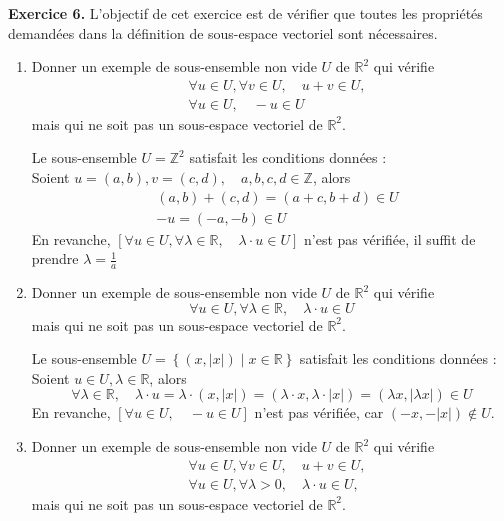 \documentclass[a4paper, 10pt]{report}
\providecommand{\abs}[1]{\lvert#1\rvert}
\begin{document}
	
	\newpage
	
	\noindent
	\textbf{Exercice 6.} L’objectif de cet exercice est de
	vérifier que toutes les propriétés demandées dans la définition
	de sous-espace vectoriel sont nécessaires.
	
	\begin{enumerate}[label=\arabic*.]
		\item Donner un exemple de sous-ensemble non vide $U$ de
		$\mathbb{R}^2$ qui vérifie
		\[\begin{split}
			&\forall u \in U, \forall v \in U, \quad u + v \in U,\\
			&\forall u \in U, \quad -u \in U
		\end{split}\]
		mais qui ne soit pas un sous-espace vectoriel de $\mathbb{R}^2$.
		
		\colorbox{solution}
		{
			\begin{minipage}{0.9\textwidth}
				Le sous-ensemble $U = \mathbb{Z}^2$ satisfait les
				conditions données :\\
				Soient $u = (a, b), v = (c, d),
					\quad a, b, c, d \in \mathbb{Z}$, alors
				\[\begin{split}
					&(a, b) + (c, d) = (a+c, b+d) \in U\\
					&-u = (-a, -b) \in U
				\end{split}\]
				En revanche, $[\forall u \in U,
					\forall \lambda \in \mathbb{R}, \quad
					\lambda \cdot u \in U]$ n'est pas vérifiée,
				il suffit de prendre $\lambda = \frac{1}{a}$
			\end{minipage}
		}
		\item Donner un exemple de sous-ensemble non vide $U$ de
		$\mathbb{R}^2$ qui vérifie
		\[
			\forall u \in U, \forall \lambda \in \mathbb{R}, \quad
				\lambda \cdot u \in U
		\]
		mais qui ne soit pas un sous-espace vectoriel de $\mathbb{R}^2$.
		
		\colorbox{solution}
		{
			\begin{minipage}{0.9\textwidth}
				Le sous-ensemble $U = \left\{(x, \abs{x}) \mid 
					x \in \mathbb{R} \right\}$ satisfait les
				conditions données :\\
				Soient $u \in U, \lambda \in \mathbb{R}$, alors
				\[
					\forall \lambda \in \mathbb{R}, \quad
						\lambda \cdot u = \lambda \cdot (x, \abs{x})
						= (\lambda \cdot x, \lambda \cdot \abs{x})
						= (\lambda x, \abs{\lambda x}) \in U
				\]
				En revanche, $[\forall u \in U, \quad -u \in U]$ n'est
				pas vérifiée, car $(-x, -\abs{x}) \notin U$.
			\end{minipage}
		}
		\item Donner un exemple de sous-ensemble non vide $U$ de
		$\mathbb{R}^2$ qui vérifie
		\[\begin{split}
			&\forall u \in U, \forall v \in U, \quad u + v \in U,\\
			&\forall u \in U, \forall \lambda > 0, \quad
				\lambda \cdot u \in U,
		\end{split}\]
		mais qui ne soit pas un sous-espace vectoriel de $\mathbb{R}^2$.
		

\end{enumerate}
\end{document}
